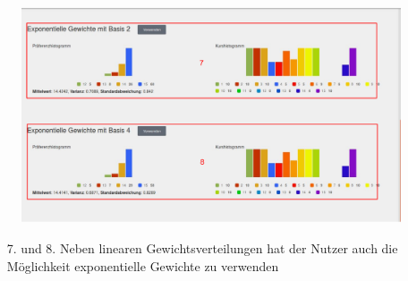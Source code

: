   \begin{figure}
  	\centering
  	\includegraphics[scale=0.5]{backend/img/distribution_3.pdf}
  \end{figure}
  \begin{enumerate}
   \item[7. und 8.] Neben linearen Gewichtsverteilungen hat der Nutzer auch die Möglichkeit exponentielle Gewichte zu verwenden
  \end{enumerate}

